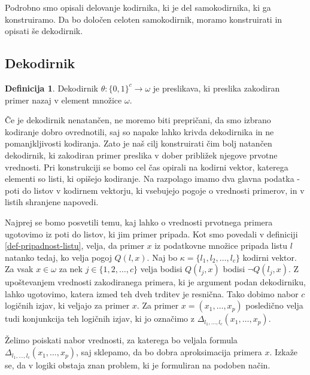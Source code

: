 \documentclass[12pt,a4paper,twoside]{article}
\theoremstyle{definition} %
\newtheorem{definicija}{Definicija}[section]
\theoremstyle{plain} %
\numberwithin{equation}{section}  %
\begin{document}
Podrobno smo opisali delovanje kodirnika, ki je del samokodirnika, ki ga konstruiramo. 
Da bo določen celoten samokodirnik, moramo konstruirati in opisati še dekodirnik.



\subsection{Dekodirnik}

\begin{definicija}
	\label{def-dekodiranje}
	Dekodirnik $\theta: \{0,1\}^c \rightarrow \omega$ je preslikava, ki preslika zakodiran primer nazaj v element množice $\omega$.
\end{definicija}
Če je dekodirnik nenatančen, ne moremo biti prepričani, da smo izbrano kodiranje dobro ovrednotili, saj so napake lahko krivda dekodirnika in ne pomanjkljivosti kodiranja.
Zato je naš cilj konstruirati čim bolj natančen dekodirnik, ki zakodiran primer preslika v dober približek njegove prvotne vrednosti.
Pri konstrukciji se bomo cel čas opirali na kodirni vektor, katerega elementi so listi, ki opišejo kodiranje.
Na razpolago imamo dva glavna podatka - poti do listov v kodirnem vektorju, ki vsebujejo pogoje o vrednosti primerov, in v listih shranjene napovedi. 

Najprej se bomo posvetili temu, kaj lahko o vrednosti prvotnega primera ugotovimo iz poti do listov, ki jim primer pripada.
Kot smo povedali v definiciji \ref{def-pripadnost-listu}, velja, da primer $x$ iz podatkovne množice pripada listu $l$ natanko tedaj, ko velja pogoj $Q(l,x)$.
Naj bo $\kappa=\{l_1, l_2, \ldots, l_c\}$ kodirni vektor.
Za vsak $x \in \omega$ za nek $j \in \{1,2,\ldots,c\}$ velja bodisi $Q(l_j,x)$ bodisi $\lnot Q(l_j,x)$.
Z upoštevanjem vrednosti zakodiranega primera, ki je argument podan dekodirniku, lahko ugotovimo, katera izmed teh dveh trditev je resnična.
Tako dobimo nabor $c$ logičnih izjav, ki veljajo za primer $x$.
Za primer $x=(x_1,\ldots,x_p)$ posledično velja tudi konjunkcija teh logičnih izjav, ki jo označimo z $\Delta_{l_1,\ldots,l_c}(x_1,\ldots,x_p)$.

Želimo poiskati nabor vrednosti, za katerega bo veljala formula $\Delta_{l_1,\ldots,l_c}(x_1,\ldots,x_p)$, saj sklepamo, da bo dobra aproksimacija primera $x$.
Izkaže se, da v logiki obstaja znan problem, ki je formuliran na podoben način.
\end{document}

